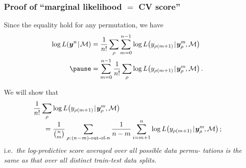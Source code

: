 \documentclass[18pt]{beamer}
\newcommand{\defineTightSpacing}{%
	\setlength{\abovedisplayskip}{.25\baselineskip}%
	\setlength{\belowdisplayskip}{.25\baselineskip}%
}
\newcommand{\given}{\thinnerspace | \thinnerspace}
\newcommand{\spacedColon}{\mkern .5mu : \mkern 1mu}
\newcommand{\thinnerspace}{\mskip.5\thinmuskip}
\newcommand{\negthinnerspace}{\mskip-.5\thinmuskip}
\newcommand{\likelihood}{L}
\newcommand{\by}{\bm{y}}
\newcommand{\modelSymbol}{\mathcal{M}}
\newcommand{\permutation}{\rho}
\newcommand{\trainingSize}{m}
\newcommand{\testSampleIndex}{i}
\begin{document}
\begin{frame}
\frametitle{Proof of ``marginal likelihood $=$ {\large CV} score''}
Since the equality hold for any permutation, we have
\begin{equation*} \defineTightSpacing%
\begin{aligned}
\log \likelihood(\by^n \given \modelSymbol)
	&= \frac{1}{n!} \sum_\permutation \sum_{\trainingSize = 0}^{n - 1} \log \likelihood\!\left(y_{\permutation(\trainingSize + 1)} \given \by_\permutation^\trainingSize\negthinnerspace, \modelSymbol \right) \\
	\pause
	&= \sum_{\trainingSize = 0}^{n - 1} \frac{1}{n!} \sum_\permutation  \log \likelihood\!\left(y_{\permutation(\trainingSize + 1)} \given \by_\permutation^\trainingSize\negthinnerspace, \modelSymbol \right).
\end{aligned}
\end{equation*}

\pause
\vspace*{-.5\baselineskip}
We will show that 
\begin{equation*} %
\begin{aligned}
&\frac{1}{n!} \sum_\permutation \log \likelihood\!\left(y_{\permutation(\trainingSize + 1)} \given \by_\permutation^\trainingSize\negthinnerspace, \modelSymbol \right) \\[-.25\baselineskip]
&\hspace*{1.5em}= \frac{1}{{n \choose \trainingSize}} \sum_{\permutation \spacedColon \text{$(n\!-\!\trainingSize)$-out-of-$n$}} 
	\frac{1}{n - \trainingSize} \sum_{\testSampleIndex = \trainingSize + 1}^n
		\log \likelihood\!\left(y_{\permutation(\trainingSize + 1)} \given \by_\permutation^\trainingSize\negthinnerspace, \modelSymbol \right);
\end{aligned}
\end{equation*}
\pause%
i.e.\ \textit{the log-predictive score averaged over all possible data permu- tations is the same as that over all distinct train-test data splits}.
\end{frame}
\end{document}
